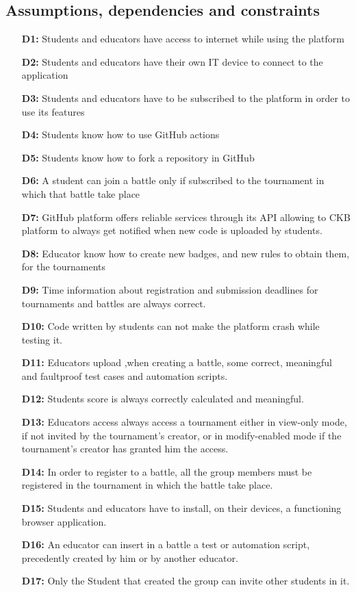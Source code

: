 \documentclass{article}
\begin{document}
{%
\newpage

\subsection{Assumptions, dependencies and constraints}
\begin{itemize}
    \item[\textbf{D1:}] Students and educators have access to internet while using the platform
    \item[\textbf{D2:}] Students and educators have their own IT device to connect to the application
    \item[\textbf{D3:}] Students and educators have to be subscribed to the platform in order to use its features
    \item[\textbf{D4:}] Students know how to use GitHub actions
    \item[\textbf{D5:}] Students know how to fork a repository in GitHub
    \item[\textbf{D6:}] A student can join a battle only if subscribed to the tournament in which that battle take place
    \item[\textbf{D7:}] GitHub platform offers reliable services through its API allowing to CKB platform to always get notified when new code is uploaded by students.
    \item[\textbf{D8:}] Educator know how to create new badges, and new rules to obtain them, for the tournaments
    \item[\textbf{D9:}] Time information about registration and submission deadlines for tournaments and battles are always correct.
    \item[\textbf{D10:}] Code written by students can not make the platform crash while testing it.
    \item[\textbf{D11:}] Educators upload ,when creating a battle, some correct, meaningful and faultproof test cases and automation scripts.
    \item[\textbf{D12:}] Students score is always correctly calculated and meaningful.
    \item[\textbf{D13:}] Educators access always access a tournament either in view-only mode, if not invited by the tournament's creator, or in modify-enabled mode if the tournament's creator has granted him the access.
    \item[\textbf{D14:}] In order to register to a battle, all the group members must be registered in the tournament
          in which the battle take place.
    \item[\textbf{D15:}] Students and educators have to install, on their devices, a functioning browser application.
    \item[\textbf{D16:}] An educator can insert in a battle a test or automation script, precedently created by him or by another
          educator.
    \item[\textbf{D17:}] Only the Student that created the group can invite other students in it.
\end{itemize}


}
\end{document}

